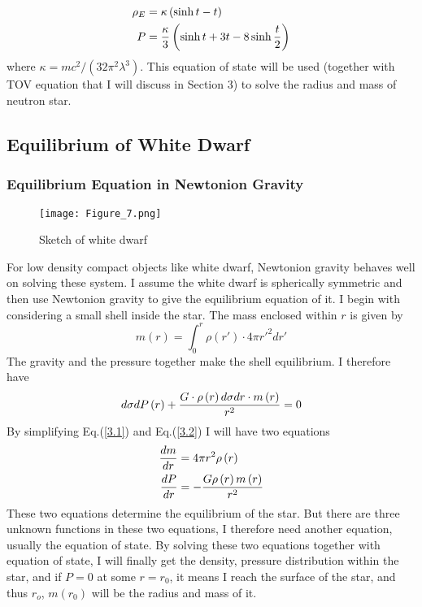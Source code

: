 \documentclass[reprint]{revtex4-1}
\begin{document}
\begin{align}
{\rho _E} &= \kappa \left( {\sinh t - t} \right)\nonumber \\
P &= {\kappa  \over 3}\left( {\sinh t + 3t - 8\sinh {t \over 2}} \right) \label{2.5}
\end{align}
where $\kappa  = m{c^2}/\left( {32{\pi ^2}{\lambda ^3}} \right)$. This equation of state will be used (together with TOV equation that I will discuss in Section 3) to solve the radius and mass of neutron star. 

\subsection{Equilibrium of White Dwarf}
\subsubsection{Equilibrium Equation in Newtonion Gravity}
\begin{figure}
	\centering   
	\texttt{[image: Figure\_7.png]}  
	\caption{Sketch of white dwarf} 
	\label{fig:7} 
\end{figure}
For low density compact objects like white dwarf, Newtonion gravity behaves well on solving these system. I assume the white dwarf is spherically symmetric and then use Newtonion gravity to give the equilibrium equation of it. I begin with considering a small shell inside the star. The mass enclosed within $r$ is given by
\begin{equation}
m\left( r \right) = \int_0^r {\rho \left( {r'} \right) \cdot 4\pi r{'^2}} dr' \label{3.1}
\end{equation}
The gravity and the pressure together make the shell equilibrium. I therefore have
\begin{equation}
d\sigma dP\left( r \right) + {{G \cdot \rho \left( r \right)d\sigma dr \cdot m\left( r \right)} \over {{r^2}}} = 0 \label{3.2}
\end{equation}
By simplifying Eq.(\ref{3.1}) and Eq.(\ref{3.2}) I will have two equations
\begin{align}
{{dm} \over {dr}} &= 4\pi {r^2}\rho \left( r \right) \label{3.3}\\
{{dP} \over {dr}} &=  - {{G\rho \left( r \right)m\left( r \right)} \over {{r^2}}} \label{3.4}
\end{align}
These two equations determine the equilibrium of the star. But there are three unknown functions in these two equations, I therefore need another equation, usually the equation of state. By solving these two equations together with equation of state, I will finally get the density, pressure distribution within the star, and if $P=0$ at some $r=r_0$, it means I reach the surface of the star, and thus $r_o$, $m(r_0)$ will be the radius and mass of it. 
\end{document}
